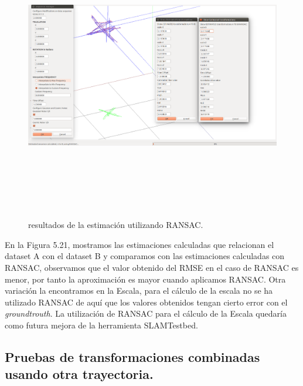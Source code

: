 \begin{figure}
\begin{center}
\label{fig:opciones de View}\includegraphics[height=12.0cm,width=18.0cm]{img/cap6/RANSAC_ScaleTraslaRotaGausCosmicNoise_ab.png}
\hspace{0.5cm}

\end{center}

\caption{ resultados de la estimación  utilizando RANSAC.}
\end{figure}

En la Figura 5.21, mostramos las estimaciones calculadas que relacionan el dataset A con el dataset B y comparamos con las estimaciones calculadas con RANSAC, observamos que el valor obtenido del RMSE en el caso de RANSAC es menor, por tanto la aproximación es mayor cuando aplicamos RANSAC.
Otra variación la encontramos en la Escala, para el cálculo de la escala no se ha utilizado RANSAC de aquí que los valores obtenidos tengan cierto error con el \textit{groundtrouth}.
La utilización de RANSAC para el cálculo de la Escala quedaría como futura mejora de la herramienta SLAMTestbed.



\subsection {Pruebas de transformaciones combinadas usando otra trayectoria.}

